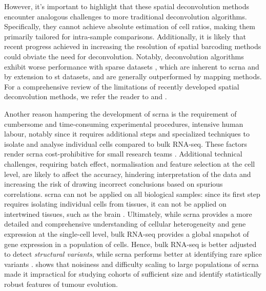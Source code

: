 However, it's important to highlight that these spatial deconvolution methods encounter analogous challenges to more traditional deconvolution algorithms. Specifically, they cannot achieve absolute estimation of cell ratios, making them primarily tailored for intra-sample comparisons. Additionally, it is likely that recent progress achieved in increasing the resolution of spatial barcoding methods   could obviate the need for deconvolution. Notably, deconvolution algorithms exhibit worse performance with sparse datasets \autocite{kleshchevnikov_etal20}, which are inherent to \acrshort{scrna} and by extension to \acrshort{st} datasets, and are generally outperformed by mapping methods. For a comprehensive review of the limitations of recently developed spatial deconvolution methods, we refer the reader to \autocite{rao_etal21} and \autocite{longo_etal21}.


Another reason hampering the development of \acrshort{scrna} is the requirement of cumbersome and time-consuming experimental procedures, intensive human labour, notably since it requires additional steps and specialized techniques to isolate and analyse individual cells compared to bulk RNA-seq. These factors render \acrshort{scrna} cost-prohibitive for small research teams \autocite{pfisterer_etal21} \autocite{dia_cheeseman21}.  
Additional technical challenges, requiring batch effect, normalisation and feature selection at the cell level, are likely to affect the accuracy, hindering interpretation of the data and increasing the risk of drawing incorrect conclusions based on spurious correlations. 
\acrshort{scrna} can not be applied on all biological samples: since its first step requires isolating individual cells from tissues, it can not be applied on intertwined tissues, such as the brain \autocite{sosina_etal21}.
Ultimately, while \acrshort{scrna} provides a more detailed and comprehensive understanding of cellular heterogeneity and gene expression at the single-cell level, bulk RNA-seq provides a global snapshot of gene expression in a population of cells. Hence, bulk RNA-seq is better adjusted to detect \emph{structural variants}, while \acrshort{scrna} performs better at identifying rare splice variants \autocite{kim_etal21}. \autocite{lei_etal20} shows that noisiness and difficulty scaling to large populations of \acrshort{scrna} made it impractical for studying cohorts of sufficient size and identify statistically robust features of tumour evolution. 




